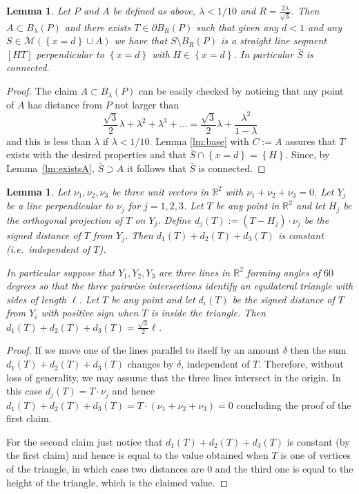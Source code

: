 \documentclass{amsart}
\newcommand{\RR}{\mathbb R}
\newcommand{\ENCLOSE}[1]{\left\{#1\right\}}
\newcommand{\M}{\mathcal{M}}
\newtheorem{lemma}[theorem]{Lemma}
\theoremstyle{definition}
\theoremstyle{remark}
\begin{document}
\begin{lemma}\label{lm:01}
  Let $P$ and $A$ be defined as above,
  $\lambda < 1/10$ and
  $R=\frac{2\lambda}{\sqrt 3}$.
  Then $A\subset B_\lambda(P)$ and 
  there exists $T\in \partial B_R(P)$ such that
  given any $d<1$ and any
  $S\in \M(\ENCLOSE{x=d}\cup A)$ 
  we have that $S\setminus B_R(P)$ is a straight line segment
  $[HT]$ perpendicular to $\ENCLOSE{x=d}$ 
  with $H\in \ENCLOSE{x=d}$.
  In particular $\bar S$ is connected.
\end{lemma}
\begin{proof}
  The claim $A\subset B_\lambda(P)$ can be easily checked
  by noticing that any point of $A$ has distance
  from $P$ not larger than 
  \[
      \frac{\sqrt 3}{2}\lambda + \lambda^2 + \lambda^3 + \dots
      = \frac{\sqrt 3}{2}\lambda + \frac{\lambda^2}{1-\lambda}
  \]
  and this is less than $\lambda$ if $\lambda < 1/10$.
  Lemma \ref{lm:base} with $C:=A$ assures that 
  $T$ exists with the desired properties and 
  that $\bar S\cap \ENCLOSE{x=d} =\ENCLOSE{H}$.
  Since, by Lemma~\ref{lm:existsA}, $\bar S \supset A$
  it follows that $\bar S$ is connected.
\end{proof}

\begin{lemma}\label{lm:tripod}
  Let $\nu_1,\nu_2,\nu_3$ be three unit vectors in $\RR^2$
  with $\nu_1+\nu_2+\nu_3=0$. 
  Let $Y_j$ be a line perpendicular to $\nu_j$ for $j=1,2,3$.
  Let $T$ be any point in $\RR^2$ and let $H_j$ be the orthogonal 
  projection of $T$ on $Y_j$.
  Define $d_j(T) := (T-H_j)\cdot \nu_j$
  be the signed distance of $T$ from $Y_j$.
  Then $d_1(T) + d_2(T) + d_3(T)$ is constant 
  (i.e.\ independent of $T$).

  In particular suppose that  
  $Y_1,Y_2,Y_3$ are three lines in $\RR^2$
  forming angles of $60$ degrees so that 
  the three pairwise intersections identify
  an equilateral triangle with sides of length $\ell$.
  Let $T$ be any point and let $d_i(T)$ be 
  the signed distance of $T$ from $Y_i$
  with positive sign when $T$ is inside the triangle.
  Then $d_1(T) + d_2(T) + d_3(T) = \frac{\sqrt 3}{2}\ell$.
\end{lemma}
\begin{proof}
  If we move one of the lines parallel to itself by an amount $\delta$ 
  then the sum $d_1(T)+d_2(T)+d_3(T)$ changes by $\delta$, independent 
  of $T$.
  Therefore, without loss of generality, we may assume that the three lines 
  intersect in the origin.
  In this case $d_j(T) = T\cdot \nu_j$ and hence 
  $d_1(T)+d_2(T)+d_3(T) = T\cdot (\nu_1+\nu_2+\nu_3) = 0$
  concluding the proof of the first claim.

  For the second claim just notice that $d_1(T)+d_2(T)+d_3(T)$
  is constant (by the first claim) and hence is equal to the value 
  obtained when $T$ is one of vertices of the triangle, in which case 
  two distances are $0$ and the third one is equal to the height of the
  triangle, which is the claimed value.
\end{proof}
\end{document}
